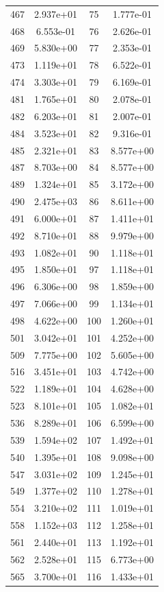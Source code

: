 \documentclass[12pt]{article}
\begin{document}
\begin{longtable}{@{}cccc@{}}
467 & 2.937e+01 & 75 & 1.777e-01 \\
468 & 6.553e-01 & 76 & 2.626e-01 \\
469 & 5.830e+00 & 77 & 2.353e-01 \\
473 & 1.119e+01 & 78 & 6.522e-01 \\
474 & 3.303e+01 & 79 & 6.169e-01 \\
481 & 1.765e+01 & 80 & 2.078e-01 \\
482 & 6.203e+01 & 81 & 2.007e-01 \\
484 & 3.523e+01 & 82 & 9.316e-01 \\
485 & 2.321e+01 & 83 & 8.577e+00 \\
487 & 8.703e+00 & 84 & 8.577e+00 \\
489 & 1.324e+01 & 85 & 3.172e+00 \\
490 & 2.475e+03 & 86 & 8.611e+00 \\
491 & 6.000e+01 & 87 & 1.411e+01 \\
492 & 8.710e+01 & 88 & 9.979e+00 \\
493 & 1.082e+01 & 90 & 1.118e+01 \\
495 & 1.850e+01 & 97 & 1.118e+01 \\
496 & 6.306e+00 & 98 & 1.859e+00 \\
497 & 7.066e+00 & 99 & 1.134e+01 \\
498 & 4.622e+00 & 100 & 1.260e+01 \\
501 & 3.042e+01 & 101 & 4.252e+00 \\
509 & 7.775e+00 & 102 & 5.605e+00 \\
516 & 3.451e+01 & 103 & 4.742e+00 \\
522 & 1.189e+01 & 104 & 4.628e+00 \\
523 & 8.101e+01 & 105 & 1.082e+01 \\
536 & 8.289e+01 & 106 & 6.599e+00 \\
539 & 1.594e+02 & 107 & 1.492e+01 \\
540 & 1.395e+01 & 108 & 9.098e+00 \\
547 & 3.031e+02 & 109 & 1.245e+01 \\
549 & 1.377e+02 & 110 & 1.278e+01 \\
554 & 3.210e+02 & 111 & 1.019e+01 \\
558 & 1.152e+03 & 112 & 1.258e+01 \\
561 & 2.440e+01 & 113 & 1.192e+01 \\
562 & 2.528e+01 & 115 & 6.773e+00 \\
565 & 3.700e+01 & 116 & 1.433e+01 \\

\end{longtable}
\end{document}
